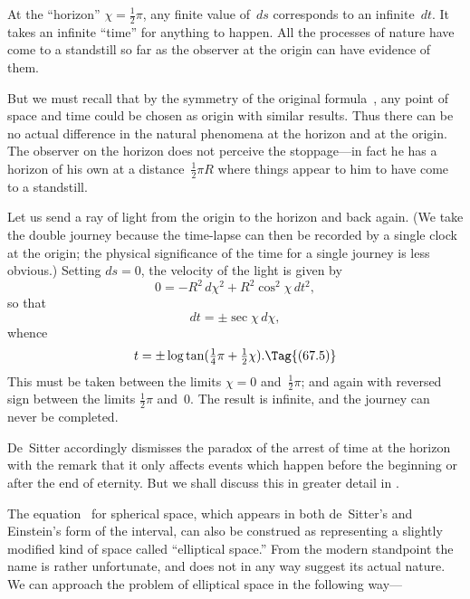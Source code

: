 \documentclass[12pt]{book}
\begin{document}
At the ``horizon'' $\chi = \frac{1}{2}\pi$, any finite value of~$ds$ corresponds to an infinite~$dt$.
It takes an infinite ``time'' for anything to happen. All the processes of
nature have come to a standstill so far as the observer at the origin can have
evidence of them.

But we must recall that by the symmetry of the original formula~,
any point of space and time could be chosen as origin with similar results.
Thus there can be no actual difference in the natural phenomena at the horizon
and at the origin. The observer on the horizon does not perceive the stoppage---in
fact he has a horizon of his own at a distance~$\frac{1}{2}\pi R$ where things appear
to him to have come to a standstill.

Let us send a ray of light from the origin to the horizon and back again.
(We take the double journey because the time-lapse can then be recorded by
a single clock at the origin; the physical significance of the time for a single
journey is less obvious.) Setting $ds = 0$, the velocity of the light is given by
\[
0 = -R^{2}\, d\chi^{2} + R^{2} \cos^{2}\chi\, dt^{2},
\]
so that
\[
dt = \pm\sec\chi\, d\chi,
\]
whence
\[
t = \pm\log\tan(\tfrac{1}{4}\pi + \tfrac{1}{2}\chi).
\Tag{(67.5)}
\]
This must be taken between the limits $\chi = 0$ and~$\frac{1}{2}\pi$; and again with reversed
sign between the limits $\frac{1}{2}\pi$ and~$0$. The result is infinite, and the journey can
never be completed.

De~Sitter accordingly dismisses the paradox of the arrest of time at the
horizon with the remark that it only affects events which happen before the
beginning or after the end of eternity. But we shall discuss this in greater
detail in .

%

The equation~ for spherical space, which appears in both de~Sitter's
and Einstein's form of the interval, can also be construed as representing a
slightly modified kind of space called ``elliptical space.'' From the modern
standpoint the name is rather unfortunate, and does not in any way suggest
its actual nature. We can approach the problem of elliptical space in the
following way---
\end{document}
